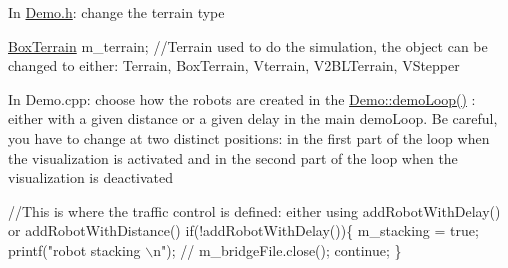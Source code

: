 In \mbox{\hyperlink{_demo_8h}{Demo.\+h}}\+: change the terrain type 
\begin{DoxyCode}
\mbox{\hyperlink{class_box_terrain}{BoxTerrain}} m\_terrain; \textcolor{comment}{//Terrain used to do the simulation, the object can be changed to either:
       Terrain, BoxTerrain, Vterrain, V2BLTerrain, VStepper}
\end{DoxyCode}


In Demo.\+cpp\+: choose how the robots are created in the \mbox{\hyperlink{class_demo_a938c3b6ab1c98ce43f977dda9d4f2b3a}{Demo\+::demo\+Loop()}} \+: either with a given distance or a given delay in the main demo\+Loop. Be careful, you have to change at two distinct positions\+: in the first part of the loop when the visualization is activated and in the second part of the loop when the visualization is deactivated 
\begin{DoxyCode}
     \textcolor{comment}{//This is where the traffic control is defined: either using addRobotWithDelay() or
       addRobotWithDistance()}
                \textcolor{keywordflow}{if}(!addRobotWithDelay())\{
                    m\_stacking = \textcolor{keyword}{true};
                    printf(\textcolor{stringliteral}{"robot stacking \(\backslash\)n"});
\textcolor{comment}{//                  m\_bridgeFile.close();}
                    \textcolor{keywordflow}{continue};
                \}
\end{DoxyCode}
 